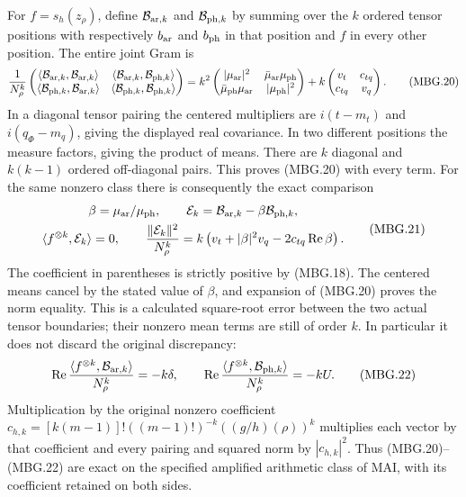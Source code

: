 For \(f=s_h(z_\rho)\), define \(\mathcal B_{{\rm ar},k}\) and
\(\mathcal B_{{\rm ph},k}\) by summing over the \(k\) ordered tensor
positions with respectively \(b_{\rm ar}\) and \(b_{\rm ph}\) in that
position and \(f\) in every other position. The entire joint Gram is
\[
 \frac1{N_\rho^k}
 \begin{pmatrix}
  \langle\mathcal B_{{\rm ar},k},\mathcal B_{{\rm ar},k}\rangle&
  \langle\mathcal B_{{\rm ar},k},\mathcal B_{{\rm ph},k}\rangle\\
  \langle\mathcal B_{{\rm ph},k},\mathcal B_{{\rm ar},k}\rangle&
  \langle\mathcal B_{{\rm ph},k},\mathcal B_{{\rm ph},k}\rangle
 \end{pmatrix}
 =
 k^2
 \begin{pmatrix}
  |\mu_{\rm ar}|^2&\bar\mu_{\rm ar}\mu_{\rm ph}\\
  \bar\mu_{\rm ph}\mu_{\rm ar}&|\mu_{\rm ph}|^2
 \end{pmatrix}
 +k\begin{pmatrix}v_t&c_{tq}\\c_{tq}&v_q\end{pmatrix}.
 \tag{MBG.20}\label{eq:mbg-joint-tensor}
\]
In a diagonal tensor pairing the centered multipliers are
\(i(t-m_t)\) and \(i(q_\Phi-m_q)\), giving the displayed real
covariance. In two different positions the measure factors, giving
the product of means. There are \(k\) diagonal and \(k(k-1)\)
ordered off-diagonal pairs. This proves (MBG.20) with every term.
For the same nonzero class there is consequently the exact comparison
\[
 \begin{gathered}
 \beta=\mu_{\rm ar}/\mu_{\rm ph},\qquad
 \mathcal E_k=\mathcal B_{{\rm ar},k}
                         -\beta\mathcal B_{{\rm ph},k},\\
 \langle f^{\otimes k},\mathcal E_k\rangle=0,\qquad
 \frac{\|\mathcal E_k\|^2}{N_\rho^k}
   =k\left(v_t+|\beta|^2v_q-2c_{tq}\operatorname{Re}\beta\right).
 \end{gathered}
 \tag{MBG.21}\label{eq:mbg-square-root-error}
\]
The coefficient in parentheses is strictly positive by (MBG.18).
The centered means cancel by the stated value of \(\beta\), and
expansion of (MBG.20) proves the norm equality. This is a calculated
square-root error between the two actual tensor boundaries; their
nonzero mean terms are still of order \(k\). In particular it does
not discard the original discrepancy:
\[
 \operatorname{Re}\frac{\langle f^{\otimes k},
                      \mathcal B_{{\rm ar},k}\rangle}{N_\rho^k}
     =-k\delta,\qquad
 \operatorname{Re}\frac{\langle f^{\otimes k},
                      \mathcal B_{{\rm ph},k}\rangle}{N_\rho^k}
     =-kU.
 \tag{MBG.22}\label{eq:mbg-mean-retained}
\]
Multiplication by the original nonzero coefficient
\(c_{h,k}=[k(m-1)]!((m-1)!)^{-k}((g/h)(\rho))^k\) multiplies
each vector by that coefficient and every pairing and squared norm
by \(|c_{h,k}|^2\). Thus (MBG.20)--(MBG.22) are exact on the
specified amplified arithmetic class of MAI, with its coefficient
retained on both sides.

